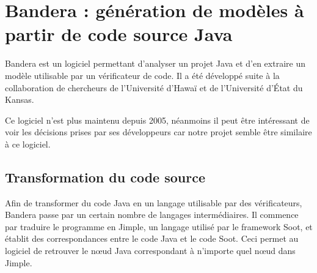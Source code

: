 \chapter{Bandera : génération de modèles à partir de code source Java}

Bandera est un logiciel permettant d'analyser un projet Java et d'en
extraire un modèle utilisable par un vérificateur de code. Il a été
développé suite à la collaboration de chercheurs de l'Université
d'Hawaï et de l'Université d'État du Kansas.

Ce logiciel n'est plus maintenu depuis 2005, néanmoins il peut être
intéressant de voir les décisions prises par ses développeurs car
notre projet semble être similaire à ce logiciel.

\section{Transformation du code source}

Afin de transformer du code Java en un langage utilisable par des
vérificateurs, Bandera passe par un certain nombre de langages
intermédiaires. Il commence par traduire le programme en Jimple, un
langage utilisé par le framework Soot, et établit des correspondances
entre le code Java et le code Soot. Ceci permet au logiciel de
retrouver le n\oe{}ud Java correspondant à n'importe quel n\oe{}ud
dans Jimple.

